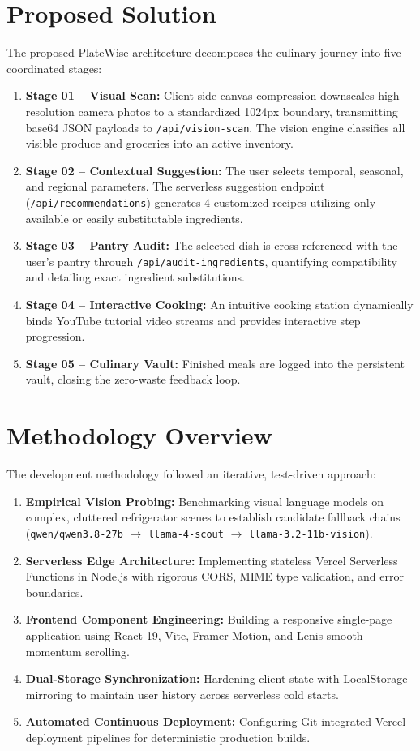 \section{Proposed Solution}
The proposed PlateWise architecture decomposes the culinary journey into five coordinated stages:
\begin{enumerate}
    \item \textbf{Stage 01 -- Visual Scan:} Client-side canvas compression downscales high-resolution camera photos to a standardized 1024px boundary, transmitting base64 JSON payloads to \texttt{/api/vision-scan}. The vision engine classifies all visible produce and groceries into an active inventory.
    \item \textbf{Stage 02 -- Contextual Suggestion:} The user selects temporal, seasonal, and regional parameters. The serverless suggestion endpoint (\texttt{/api/recommendations}) generates 4 customized recipes utilizing only available or easily substitutable ingredients.
    \item \textbf{Stage 03 -- Pantry Audit:} The selected dish is cross-referenced with the user's pantry through \texttt{/api/audit-ingredients}, quantifying compatibility and detailing exact ingredient substitutions.
    \item \textbf{Stage 04 -- Interactive Cooking:} An intuitive cooking station dynamically binds YouTube tutorial video streams and provides interactive step progression.
    \item \textbf{Stage 05 -- Culinary Vault:} Finished meals are logged into the persistent vault, closing the zero-waste feedback loop.
\end{enumerate}

\section{Methodology Overview}
The development methodology followed an iterative, test-driven approach:
\begin{enumerate}
    \item \textbf{Empirical Vision Probing:} Benchmarking visual language models on complex, cluttered refrigerator scenes to establish candidate fallback chains (\texttt{qwen/qwen3.8-27b} $\rightarrow$ \texttt{llama-4-scout} $\rightarrow$ \texttt{llama-3.2-11b-vision}).
    \item \textbf{Serverless Edge Architecture:} Implementing stateless Vercel Serverless Functions in Node.js with rigorous CORS, MIME type validation, and error boundaries.
    \item \textbf{Frontend Component Engineering:} Building a responsive single-page application using React 19, Vite, Framer Motion, and Lenis smooth momentum scrolling.
    \item \textbf{Dual-Storage Synchronization:} Hardening client state with LocalStorage mirroring to maintain user history across serverless cold starts.
    \item \textbf{Automated Continuous Deployment:} Configuring Git-integrated Vercel deployment pipelines for deterministic production builds.
\end{enumerate}

